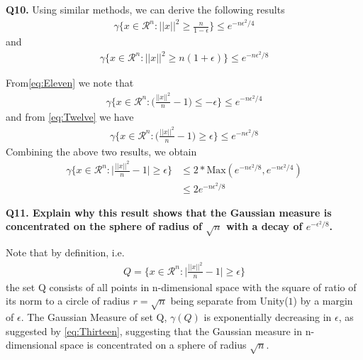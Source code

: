 \documentclass[11pt]{article}
\begin{document}
\hrulefill \vspace{2 pt}

\textbf{Q10. }
Using similar methods, we can derive the following results
\begin{align}
\gamma \bigg\{ x\in \mathcal{R}^n \colon ||x||^2 \geq \frac{n}{1-\epsilon} \bigg\} \leq e^{-n\epsilon^2 / 4} \label{eq:Eleven}
\end{align}
and
\begin{align}
\gamma \bigg\{ x\in \mathcal{R}^n \colon ||x||^2 \geq n(1+ \epsilon) \bigg\} \leq e^{-n\epsilon^2 / 8} \label{eq:Twelve}
\end{align}

From\eqref{eq:Eleven} we note that
\begin{align*}
\gamma \bigg\{ x\in \mathcal{R}^n \colon \bigg(\frac{||x||^2}{n} - 1 \bigg) \leq -\epsilon  \bigg\} \leq e^{-n\epsilon^2 / 4}
\end{align*}
and from \eqref{eq:Twelve} we have
\begin{align}
\gamma \bigg\{ x\in \mathcal{R}^n \colon \bigg( \frac{||x||^2}{n} - 1 \bigg) \geq \epsilon  \bigg\} \leq e^{-n\epsilon^2 / 8} 
\end{align}
Combining the above two results, we obtain
\begin{align}
\gamma \bigg\{ x\in \mathcal{R}^n \colon \bigg| \frac{||x||^2}{n} - 1 \bigg| \geq \epsilon  \bigg\} &\leq 2* \text{Max}(e^{-n\epsilon^2 / 8},e^{-n\epsilon^2 / 4}) \\
&\leq 2e^{-n\epsilon^2 / 8} \label{eq:Thirteen}
\end{align}

\hrulefill \vspace{2 pt}

\textbf{Q11. Explain why this result shows that the Gaussian measure is concentrated on the sphere of radius of $\sqrt{n}$ with a decay of $e^{-\epsilon^2/8}$.}

Note that by definition, i.e.
\begin{align*}
Q = \bigg\{ x\in \mathcal{R}^n \colon \bigg| \frac{||x||^2}{n} - 1 \bigg| \geq \epsilon  \bigg\}
\end{align*}
the set Q consists of all points in n-dimensional space with the square of ratio of its norm to a circle of radius $r = \sqrt{n}$ being separate from Unity($1$) by a margin of $\epsilon$. 
The Gaussian Measure of set Q, $\gamma(Q)$ is exponentially decreasing in $\epsilon$, as suggested by \eqref{eq:Thirteen}, suggesting that the Gaussian measure in n-dimensional space is concentrated on a sphere of radius $\sqrt{n}$.
\end{document}
